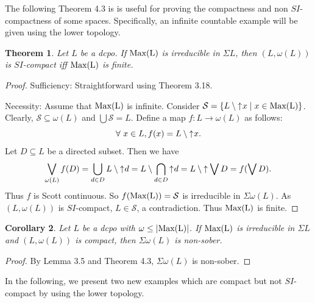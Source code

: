 \documentclass[preprint,12pt]{elsarticle}
\numberwithin{equation}{section}
\newtheorem{theorem}{Theorem}[section]
\newtheorem{corollary}[theorem]{Corollary}
\newcommand{\up}{\mathord{\uparrow}\hspace{0.05em}}
\begin{document}
\quad The following Theorem 4.3 is is useful for proving the compactness and non $SI$-compactness of some spaces. Specifically, an infinite countable example will be given using the lower topology.


\begin{theorem} Let $L$ be a dcpo. If ${\rm Max(L)}$ is irreducible in $\Sigma L$, then $(L,\omega(L))$ is $SI$-compact iff ${\rm Max(L)}$ is finite.
\end{theorem}
\begin{proof}Sufficiency: Straightforward using Theorem 3.18.

Necessity: Assume that ${\rm Max(L)}$ is infinite. Consider $\mathcal{S}=\{L\setminus\up x\mid x\in {\rm Max(L)}\}$. Clearly, $\mathcal{S}\subseteq\omega(L)$ and $\bigcup \mathcal{S}= L$. Define a map $f:L\longrightarrow \omega(L)$ as follows:
$$\forall\ x\in L, f(x)=L\setminus\up x.$$
Let $D\subseteq L$ be a directed subset. Then we have $$\bigvee_{\omega(L)} f(D)=\bigcup\limits_{d\in D}L\setminus\up d=L\setminus\bigcap\limits_{d\in D}\up d=L\setminus\up \bigvee D=f(\bigvee D).$$
Thus $f$ is Scott continuous.
So $f({\rm Max(L)})=\mathcal{S}$ is irreducible in $\Sigma\omega(L)$. As $(L,\omega(L))$ is $SI$-compact, $L\in\mathcal{S}$, a contradiction. Thus ${\rm Max(L)}$ is finite.\end{proof}


\begin{corollary}Let $L$ be a dcpo with $\omega\leq|{\rm Max(L)}|$. If ${\rm Max(L)}$ is irreducible in $\Sigma L$ and $(L,\omega(L))$ is compact, then $\Sigma\omega(L)$ is non-sober.
\end{corollary}

\begin{proof}By Lemma 3.5 and Theorem 4.3, $\Sigma\omega(L)$ is non-sober.\end{proof}


\quad In the following, we present two new examples which are compact but not $SI$-compact by using the lower topology.
\end{document}
